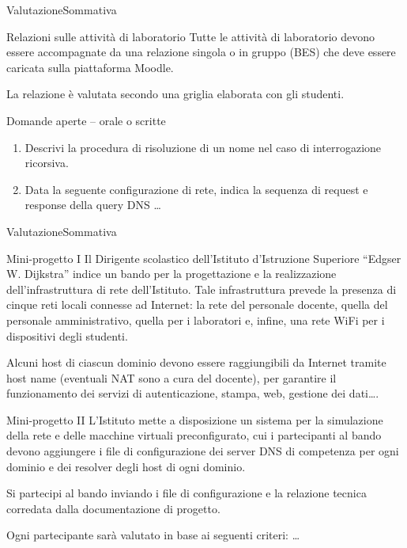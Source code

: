 \documentclass[italian]{beamer}
\begin{document}
\begin{frame}{Valutazione}{Sommativa}
	\begin{block}{Relazioni sulle attivit\`a di laboratorio}
		Tutte le attivit\`a di laboratorio devono essere accompagnate da una relazione singola o in gruppo (BES) che deve essere caricata sulla piattaforma Moodle.
		
		La relazione \`e valutata secondo una griglia elaborata con gli studenti.
	\end{block}
	\begin{block}{Domande aperte -- orale o scritte}
			\begin{enumerate}
				\item Descrivi la procedura di risoluzione di un nome nel caso di interrogazione ricorsiva.
				\item Data la seguente configurazione di rete, indica la sequenza di request e response della query DNS \ldots{}
			\end{enumerate}
	\end{block}
\end{frame}

\begin{frame}[allowframebreaks]{Valutazione}{Sommativa}
	\begin{block}{Mini-progetto I}
Il Dirigente scolastico dell'Istituto d'Istruzione Superiore ``Edgser W. Dijkstra'' indice un bando per la progettazione e la realizzazione dell'infrastruttura di rete dell'Istituto.
Tale infrastruttura prevede la presenza di cinque reti locali connesse ad Internet: la rete del personale docente, quella del personale amministrativo, quella per i laboratori e, infine, una rete WiFi per i dispositivi degli studenti.

Alcuni host di ciascun dominio devono essere raggiungibili da Internet tramite host name (eventuali NAT sono a cura del docente), per garantire il funzionamento dei servizi di autenticazione, stampa, web, gestione dei dati\ldots{}.
	\end{block}
	
	\begin{block}{Mini-progetto II}
L'Istituto mette a disposizione un sistema per la simulazione della rete e delle macchine virtuali preconfigurato, cui i partecipanti al bando devono aggiungere \alert{i file di configurazione dei server DNS di competenza per ogni dominio e dei resolver degli host di ogni dominio}.
 
Si partecipi al bando inviando i file di configurazione e la relazione tecnica corredata dalla documentazione di progetto.

Ogni partecipante sar\`a valutato in base ai seguenti criteri: \ldots
	\end{block}

\end{frame}
\end{document}
